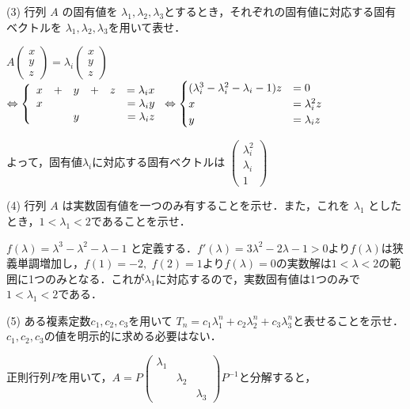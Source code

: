 \documentclass[a4j]{jarticle}
\let \ds \displaystyle
\begin{document}
\begin{screen}
 (3) 行列 $A$ の固有値を $\lambda_1,\lambda_2,\lambda_3$とするとき，それぞれの固有値に対応する固有ベクトルを $\lambda_1,\lambda_2,\lambda_3$を用いて表せ．
\end{screen}

$\ds A \begin{pmatrix} x\\ y \\ z\end{pmatrix} = \lambda_i\begin{pmatrix} x\\ y \\ z\end{pmatrix}$
$\ds \Leftrightarrow
\left\{
\begin{array}[tb]{rrrrrr}
 x&+&y&+&z&=\lambda_i x \\
 x& & & & &=\lambda_i y \\
  & &y& & &=\lambda_i z \\
\end{array}
\right.
\Leftrightarrow
\begin{cases}
 (\lambda_i^3 - \lambda_i^2 - \lambda_i - 1)z &= 0 \\
 x &= \lambda_i^2 z \\
 y &= \lambda_i   z
\end{cases}
$

よって，固有値$\lambda_i$に対応する固有ベクトルは $\begin{pmatrix} \lambda_i^2\\ \lambda_i \\ 1\end{pmatrix}$
\begin{screen}
 (4) 行列 $A$ は実数固有値を一つのみ有することを示せ．また，これを $\lambda_1$ としたとき，$1<\lambda_1<2$であることを示せ．
\end{screen}

$f(\lambda)=\lambda^3-\lambda^2-\lambda-1$ と定義する．$f'(\lambda)=3\lambda^2-2\lambda-1>0$より$f(\lambda)$は狭義単調増加し，$f(1)=-2,$ $f(2)=1$より$f(\lambda)=0$の実数解は$1<\lambda<2$の範囲に1つのみとなる．これが$\lambda_1$に対応するので，実数固有値は1つのみで$1<\lambda_1<2$である．

\begin{screen}
 (5) ある複素定数$c_1,c_2,c_3$を用いて $T_n = c_1\lambda_1^n+c_2\lambda_2^n+c_3\lambda_3^n$と表せることを示せ．$c_1,c_2,c_3$の値を明示的に求める必要はない．
\end{screen}

正則行列$P$を用いて，$\ds A = P \begin{pmatrix} \lambda_1 & & \\ & \lambda_2 & \\ & & \lambda_3 \end{pmatrix} P^{-1}$と分解すると，
\end{document}
